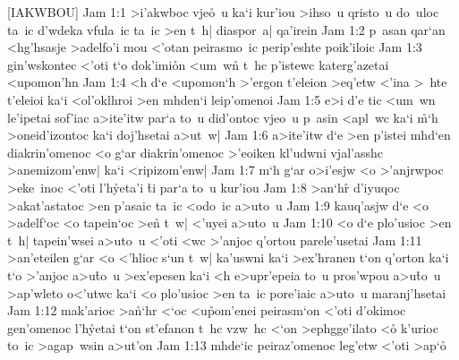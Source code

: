 [IAKWBOU]
\vs Jam 1:1
>i'akwboc
vje\r{o}~u
ka`i
kur'iou
>ihso~u
qristo~u
do~uloc
ta~ic
d'wdeka
vfula~ic
ta~ic
>en
t~h|
diaspor~a|
qa'irein\bibvsend
\vs Jam 1:2
p~asan
qar`an
<hg'hsasje
>adelfo'i
mou
<'otan
peirasmo~ic
perip'eshte
poik'iloic\bibvsend
\vs Jam 1:3
gin'wskontec
<'oti
t`o
dok'imi\r{o}n
<um~wn\r{}
t~hc
p'istewc
katerg'azetai
<upomon'hn\bibvsend
\vs Jam 1:4
<h
d`e
<upomon`h
>'ergon
t'eleion
>eq'etw
<'ina
>~hte
t'eleioi
ka`i
<ol'oklhroi
>en
mhden`i
leip'omenoi\bibvsend
\vs Jam 1:5
e>i
d'e
tic
<um~wn
le'ipetai
sof'iac
a>ite'itw
par`a
to~u
did'ontoc
vjeo~u
p~asin
<apl~wc
ka`i
\r{m}`h
>oneid'izontoc
ka`i
doj'hsetai
a>ut~w|\bibvsend
\vs Jam 1:6
a>ite'itw
d`e
>en
p'istei
mhd`en
diakrin'omenoc
<o
g`ar
diakrin'omenoc
>'eoiken
kl'udwni
vjal'asshc
>anemizom'enw|
ka`i
<ripizom'enw|\bibvsend
\vs Jam 1:7
m`h
g`ar
o>i'esjw
<o
>'anjrwpoc
>eke~inoc
<'oti
l'h\r{y}eta'i
\r{t}i
par`a
to~u
kur'iou\bibvsend
\vs Jam 1:8
>an`h\r{r}
d'iyuqoc
>akat'astatoc
>en
p'asaic
ta~ic
<odo~ic
a>uto~u\bibvsend
\vs Jam 1:9
kauq'asjw
d`e
<o
>adelf`oc
<o
tapein`oc
>e\r{n}
t~w|
<'uyei
a>uto~u\bibvsend
\vs Jam 1:10
<o
d`e
plo'usioc
>en
t~h|
tapein'wsei
a>uto~u
<'oti
<wc
>'anjoc
q'ortou
parele'usetai\bibvsend
\vs Jam 1:11
>an'eteilen
g`ar
<o
<'hlioc
s`un
t~w|
ka'uswni
ka`i
>ex'hranen
t`on
q'orton
ka`i
t`o
>'anjoc
a>u\r{t}o~u
>ex'epesen
ka`i
<h
e>upr'epeia
to~u
pros'wpou
a>u\r{t}o~u
>ap'wleto
o<'utwc
ka`i
<o
plo'usioc
>en
ta~ic
pore'iaic
a>uto~u
maranj'hsetai\bibvsend
\vs Jam 1:12
mak'arioc
>a\r{n}`hr
<`oc
<u\r{p}om'enei
peirasm`on
<'oti
d'okimoc
gen'omenoc
l'h\r{y}etai
t`on
st'efanon
t~hc
vzw~hc
<`on
>ephgge'ilato
<o\r{}
k'urioc
to~ic
>agap~wsin
a>ut'on\bibvsend
\vs Jam 1:13
mhde`ic
peiraz'omenoc
leg'etw
<'oti
>ap`o\r{}
